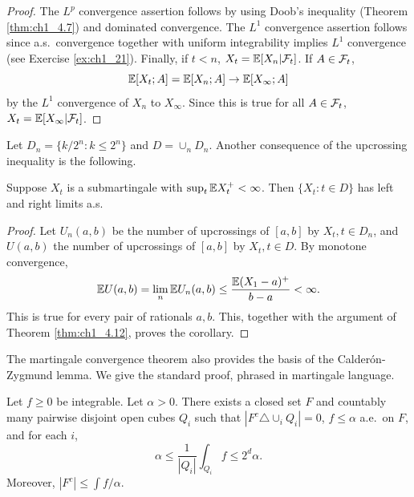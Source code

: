 \begin{proof}
The $L^p$ convergence assertion follows by using Doob's inequality (Theorem \ref{thm:ch1_4.7}) and dominated convergence. The $L^1$ convergence assertion follows since a.s.\ convergence together with uniform integrability implies $L^1$ convergence (see Exercise \ref{ex:ch1_21}). Finally, if $t < n$, $X_t = \mathbb{E}[X_n| \mathcal{F}_t]$. If $A \in \mathcal{F}_t$,
\[
    \mathbb{E}[X_t;A] = \mathbb{E}[X_n;A] \to \mathbb{E}[X_\infty;A]
\]
by the $L^1$ convergence of $X_n$ to $X_\infty$. Since this is true for all $A \in \mathcal{F}_t$, $X_t = \mathbb{E}[X_\infty| \mathcal{F}_t]$.
\end{proof}


Let $D_n = \{k/2^n : k \leq 2^n\}$ and $D = \cup_n D_n$. Another consequence of the upcrossing inequality is the following.

\begin{corollary}\label{cor:ch1_4.16}
Suppose $X_t$ is a submartingale with $\sup_t \mathbb{E} X_t^+ < \infty$. Then $\{X_t : t \in D\}$ has left and right limits a.s.
\end{corollary}

\begin{proof}
Let $U_n(a,b)$ be the number of upcrossings of $[a,b]$ by $X_t, t \in D_n$, and $U(a,b)$ the number of upcrossings of $[a,b]$ by $X_t, t \in D$. By monotone convergence,
\[
    \mathbb{E} U(a,b) = \lim_n \mathbb{E} U_n(a,b) \leq \frac{\mathbb{E}(X_1 - a)^+}{b-a} < \infty.
\]
This is true for every pair of rationals $a,b$. This, together with the argument of Theorem \ref{thm:ch1_4.12}, proves the corollary.
\end{proof}

The martingale convergence theorem also provides the basis of the Calder\'on-Zygmund lemma. We give the standard proof, phrased in martingale language.

\begin{lemma}\label{lem:ch1_4.17}
Let $f \geq 0$ be integrable. Let $\alpha > 0$. There exists a closed set $F$ and countably many pairwise disjoint open cubes $Q_i$ such that $|F^c\triangle \cup_i Q_i| = 0$, $f \leq \alpha$ a.e.\ on $F$, and for each $i$,
\begin{equation}\label{eq:ch1_4.9}
    \alpha \leq \frac{1}{|Q_i|}\int_{Q_i} f \leq 2^d\alpha.
\end{equation}
Moreover, $|F^c| \leq \int f/\alpha$.
\end{lemma}

